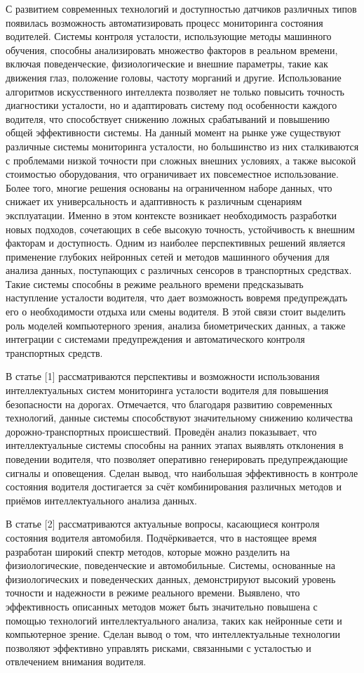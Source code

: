 С развитием современных технологий и доступностью датчиков различных
типов появилась возможность автоматизировать процесс мониторинга
состояния водителей. Системы контроля усталости, использующие методы
машинного обучения, способны анализировать множество факторов в реальном
времени, включая поведенческие, физиологические и внешние параметры,
такие как движения глаз, положение головы, частоту морганий и другие.
Использование алгоритмов искусственного интеллекта позволяет не только
повысить точность диагностики усталости, но и адаптировать систему под
особенности каждого водителя, что способствует снижению ложных
срабатываний и повышению общей эффективности системы. На данный момент
на рынке уже существуют различные системы мониторинга усталости, но
большинство из них сталкиваются с проблемами низкой точности при сложных
внешних условиях, а также высокой стоимостью оборудования, что
ограничивает их повсеместное использование. Более того, многие решения
основаны на ограниченном наборе данных, что снижает их универсальность и
адаптивность к различным сценариям эксплуатации. Именно в этом контексте
возникает необходимость разработки новых подходов, сочетающих в себе
высокую точность, устойчивость к внешним факторам и доступность. Одним
из наиболее перспективных решений является применение глубоких нейронных
сетей и методов машинного обучения для анализа данных, поступающих с
различных сенсоров в транспортных средствах. Такие системы способны в
режиме реального времени предсказывать наступление усталости водителя,
что дает возможность вовремя предупреждать его о необходимости отдыха
или смены водителя. В этой связи стоит выделить роль моделей
компьютерного зрения, анализа биометрических данных, а также интеграции
с системами предупреждения и автоматического контроля транспортных
средств.

В статье {[}1{]} рассматриваются перспективы и возможности использования
интеллектуальных систем мониторинга усталости водителя для повышения
безопасности на дорогах. Отмечается, что благодаря развитию современных
технологий, данные системы способствуют значительному снижению
количества дорожно-транспортных происшествий. Проведён анализ
показывает, что интеллектуальные системы способны на ранних этапах
выявлять отклонения в поведении водителя, что позволяет оперативно
генерировать предупреждающие сигналы и оповещения. Сделан вывод, что
наибольшая эффективность в контроле состояния водителя достигается за
счёт комбинирования различных методов и приёмов интеллектуального
анализа данных.

В статье {[}2{]} рассматриваются актуальные вопросы, касающиеся контроля
состояния водителя автомобиля. Подчёркивается, что в настоящее время
разработан широкий спектр методов, которые можно разделить на
физиологические, поведенческие и автомобильные. Системы, основанные на
физиологических и поведенческих данных, демонстрируют высокий уровень
точности и надежности в режиме реального времени. Выявлено, что
эффективность описанных методов может быть значительно повышена с
помощью технологий интеллектуального анализа, таких как нейронные сети и
компьютерное зрение. Сделан вывод о том, что интеллектуальные технологии
позволяют эффективно управлять рисками, связанными с усталостью и
отвлечением внимания водителя.

